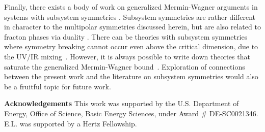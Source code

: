 \documentclass[pra,aps,twocolumn, amsfonts,amsmath,amssymb,nofootinbib,superscriptaddress]{revtex4-2}
\begin{document}
Finally, there exists a body of work on generalized Mermin-Wagner arguments in systems with subsystem symmetries \cite{Batista2005, SeibergA, SeibergB, SeibergC, Gorantla2021, Distler2021}. Subsystem symmetries are rather different in character to the multipolar symmetries discussed herein, but are also related to fracton phases via duality \cite{VHF2}. There can be theories with subsystem symmetries where symmetry breaking cannot occur even above the critical dimension, due to the UV/IR mixing~\cite{Gorantla2021}. However, it is always possible to write down theories that saturate the generalized Mermin-Wagner bound~\cite{Distler2021}.
Exploration of connections between the present work and the literature on subsystem symmetries would also be a fruitful topic for future work. 

{\bf Acknowledgements} This work was supported by
the U.S. Department of Energy, Office of Science, Basic
Energy Sciences, under Award \# DE-SC0021346. E.L. was supported by a Hertz Fellowship. 


\end{document}
